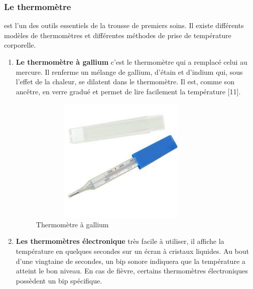 \documentclass[12pt]{article}
\begin{document}
\subsubsection{Le thermomètre}
est l’un des outils essentiels de la trousse de premiers soins. Il existe différents modèles de thermomètres et différentes méthodes de prise de température corporelle.
\begin{enumerate}
	\item \textbf{Le thermomètre à gallium} c’est le thermomètre qui a remplacé celui au mercure. Il renferme un mélange de gallium, d’étain et d’indium qui, sous l’effet de la chaleur, se dilatent dans le thermomètre. Il est, comme son ancêtre, en verre gradué et permet de lire facilement la température [11].
	\begin{figure}[h]
		\centering
		\includegraphics[height=6cm,width=9cm]{img-Chapiter-2/galune.jpeg}
		\caption{Thermomètre à gallium}
		\label{fig:gallium}
	\end{figure}
	\newpage
	\item \textbf{Les thermomètres électronique} très facile à utiliser, il affiche la température en quelques secondes sur un écran à cristaux liquides. Au bout d’une vingtaine de secondes, un bip sonore indiquera que la température a atteint le bon niveau. En cas de fièvre, certains thermomètres électroniques possèdent un bip spécifique. 
	

\end{enumerate}
\end{document}
